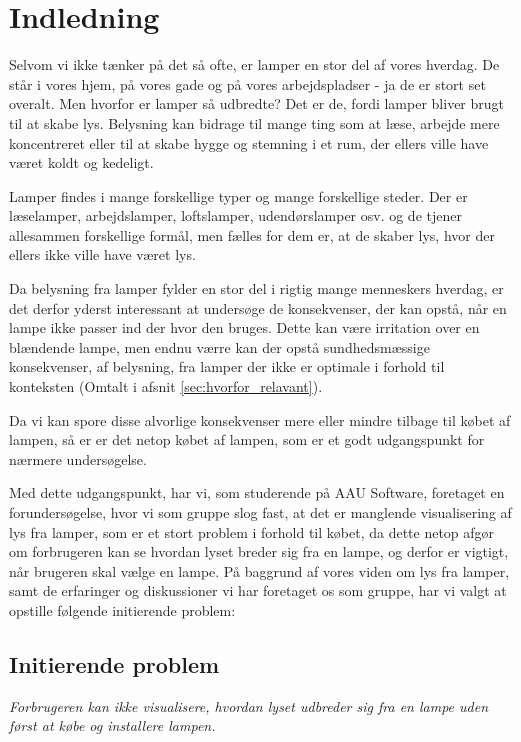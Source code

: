 \section{Indledning}
Selvom vi ikke tænker på det så ofte, er lamper en stor del af vores hverdag. De står i vores hjem, på vores gade og på vores arbejdspladser - ja de er stort set overalt. Men hvorfor er lamper så udbredte? Det er de, fordi lamper bliver brugt til at skabe lys. Belysning kan bidrage til mange ting som at læse, arbejde mere koncentreret eller til at skabe hygge og stemning i et rum, der ellers ville have været koldt og kedeligt. 

Lamper findes i mange forskellige typer og mange forskellige steder. Der er læselamper, arbejdslamper, loftslamper, udendørslamper osv. og de tjener allesammen forskellige formål, men fælles for dem er, at de skaber lys, hvor der ellers ikke ville have været lys. 

Da belysning fra lamper fylder en stor del i rigtig mange menneskers hverdag, er det derfor yderst interessant at undersøge de konsekvenser, der kan opstå, når en lampe ikke passer ind der hvor den bruges. Dette kan være irritation over en blændende lampe, men endnu værre kan der opstå sundhedsmæssige konsekvenser, af belysning, fra lamper der ikke er optimale i forhold til konteksten (Omtalt i afsnit \ref{sec:hvorfor_relavant}).

Da vi kan spore disse alvorlige konsekvenser mere eller mindre tilbage til købet af lampen, så er er det netop købet af lampen, som er et godt udgangspunkt for nærmere undersøgelse.

Med dette udgangspunkt, har vi, som studerende på AAU Software, foretaget en forundersøgelse, hvor vi som gruppe slog fast, at det er manglende visualisering af lys fra lamper, som er et stort problem i forhold til købet, da dette netop afgør om forbrugeren kan se hvordan lyset breder sig fra en lampe, og derfor er vigtigt, når brugeren skal vælge en lampe. På baggrund af vores viden om lys fra lamper, samt de erfaringer og diskussioner vi har foretaget os som gruppe, har vi valgt at opstille følgende initierende problem:

\subsection{Initierende problem}
\textit{Forbrugeren kan ikke visualisere, hvordan lyset udbreder sig fra en lampe uden først at købe og installere lampen.}

\clearpage